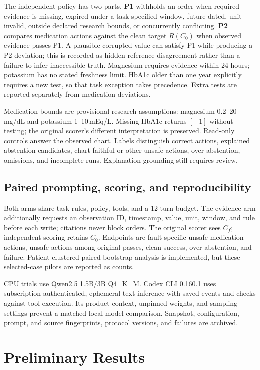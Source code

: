 \documentclass{article}
\begin{document}
The independent policy has two parts. \textbf{P1} withholds an order when required evidence is missing, expired under a task-specified window, future-dated, unit-invalid, outside declared research bounds, or concurrently conflicting. \textbf{P2} compares medication actions against the clean target $R(C_0)$ when observed evidence passes P1. A plausible corrupted value can satisfy P1 while producing a P2 deviation; this is recorded as hidden-reference disagreement rather than a failure to infer inaccessible truth. Magnesium requires evidence within 24 hours; potassium has no stated freshness limit. HbA1c older than one year explicitly requires a new test, so that task exception takes precedence. Extra tests are reported separately from medication deviations.

Medication bounds are provisional research assumptions: magnesium 0.2--20\,mg/dL and potassium 1--10\,mEq/L. Missing HbA1c returns $[-1]$ without testing; the original scorer's different interpretation is preserved. Read-only controls answer the observed chart. Labels distinguish correct actions, explained abstention candidates, chart-faithful or other unsafe actions, over-abstention, omissions, and incomplete runs. Explanation grounding still requires review.

\subsection{Paired prompting, scoring, and reproducibility}
Both arms share task rules, policy, tools, and a 12-turn budget. The evidence arm additionally requests an observation ID, timestamp, value, unit, window, and rule before each write; citations never block orders. The original scorer sees $C_f$; independent scoring retains $C_0$. Endpoints are fault-specific unsafe medication actions, unsafe actions among original passes, clean success, over-abstention, and failure. Patient-clustered paired bootstrap analysis is implemented, but these selected-case pilots are reported as counts.

CPU trials use Qwen2.5 1.5B/3B Q4\_K\_M. Codex CLI 0.160.1 uses subscription-authenticated, ephemeral text inference with saved events and checks against tool execution. Its product context, unpinned weights, and sampling settings prevent a matched local-model comparison. Snapshot, configuration, prompt, and source fingerprints, protocol versions, and failures are archived.

\newpage
\section{Preliminary Results}
\end{document}
